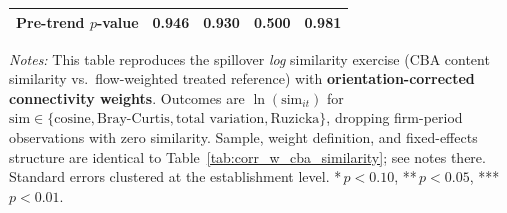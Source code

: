 \begin{table}[H]
\begin{tabular}{lcccc}
Pre-trend $p$-value & 0.946 & 0.930 & 0.500 & 0.981 \\
\hline\hline
\end{tabular}
\begin{minipage}{\linewidth}
\smallskip
\scriptsize\textit{Notes:} This table reproduces the spillover \emph{log} similarity exercise (CBA content similarity vs.\ flow-weighted treated reference) with \textbf{orientation-corrected connectivity weights}. Outcomes are $\ln(\text{sim}_{it})$ for $\text{sim} \in \{\text{cosine}, \text{Bray-Curtis}, \text{total variation}, \text{Ruzicka}\}$, dropping firm-period observations with zero similarity. Sample, weight definition, and fixed-effects structure are identical to Table~\ref{tab:corr_w_cba_similarity}; see notes there. Standard errors clustered at the establishment level. *\,$p<0.10$, **\,$p<0.05$, ***\,$p<0.01$.
\end{minipage}
\end{table}
